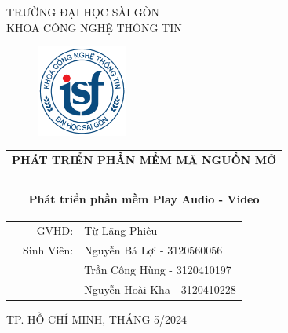 \documentclass[a4paper]{article}
\begin{document}
\begin{titlepage}
\begin{center}
TRƯỜNG ĐẠI HỌC SÀI GÒN \\
KHOA CÔNG NGHỆ THÔNG TIN
\end{center}
\vspace{1cm}

\begin{figure}[h!]
\begin{center}
\includegraphics[width=3cm]{logoITSGU.png}
\end{center}
\end{figure}

\vspace{1cm}

\begin{center}
\begin{tabular}{c}
	\multicolumn{1}{l}{\hspace{0,5cm}\textbf{{\Large \color{black} PHÁT TRIỂN PHẦN MỀM MÃ NGUỒN MỞ}}}\\
	~~\\

	\textbf{{\Large \color{black} Phát triển phần mềm Play Audio - Video}}\\

\end{tabular}
\end{center}

\vspace{3cm}
\begin{table}[h]
\begin{tabular}{rrl}
\hspace {5 cm} &\color{black} GVHD: & \color{black}Từ Lãng Phiêu\\
&\color{black} Sinh Viên: &\color{black} Nguyễn Bá Lợi - 3120560056\\
      &&\color{black} Trần Công Hùng -  3120410197\\
      && \color{black}Nguyễn Hoài Kha -  3120410228\\

\end{tabular}
\vspace{1.5 cm}
\end{table}

\begin{center}
{\footnotesize TP. HỒ CHÍ MINH, THÁNG 5/2024}
\end{center}
\end{titlepage}
\end{document}
